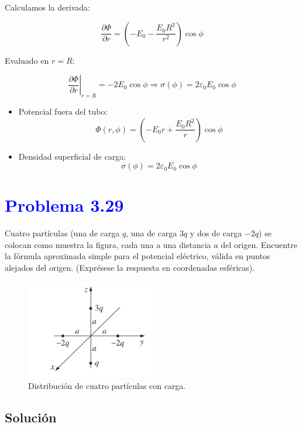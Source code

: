 \documentclass[12pt]{article}
\newcommand{\question}[1]{\textcolor{blue}{\textbf{#1}}}
\begin{document}
Calculamos la derivada:

\[
\frac{\partial \Phi}{\partial r} = \left( -E_0 - \frac{E_0 R^2}{r^2} \right) \cos \phi
\]

Evaluado en \( r = R \):

\[
\left. \frac{\partial \Phi}{\partial r} \right|_{r = R} = -2 E_0 \cos \phi
\Rightarrow
\sigma(\phi) = 2 \varepsilon_0 E_0 \cos \phi
\]


\begin{itemize}
    \item Potencial fuera del tubo:
    \[
    \Phi(r, \phi) = \left( -E_0 r + \frac{E_0 R^2}{r} \right) \cos \phi
    \]

    \item Densidad superficial de carga:
    \[
    \boxed{
    \sigma(\phi) = 2 \varepsilon_0 E_0 \cos \phi
    }
       \]
\end{itemize}

\section*{\question{Problema 3.29}}

Cuatro partículas (una de carga \( q \), una de carga \( 3q \) y dos de carga \( -2q \)) se colocan como muestra la figura, cada una a una distancia \( a \) del origen. Encuentre la fórmula aproximada simple para el potencial eléctrico, válida en puntos alejados del origen. (Exprésese la respuesta en coordenadas esféricas).

\begin{figure}[h]
    \centering
    \includegraphics[width=0.5\textwidth]{imagenes/figura3.29.png}
    \caption*{Distribución de cuatro partículas con carga.}
    \label{fig:etiqueta}
\end{figure}

\subsection*{Solución}
\end{document}
